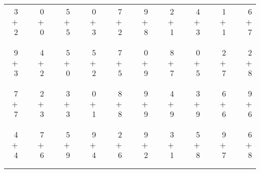 \documentclass[12pt, letterpaper]{article}
\begin{document}
\begin{tabular}{rrrrrrrrrrrrrrrrrrr}
3 & & 0 & & 5 & & 0 & & 7 & & 9 & & 2 & & 4 & & 1 & & 6\\
$+$ 2 & & $+$ 0 & & $+$ 5 & & $+$ 3 & & $+$ 2 & & $+$ 8 & & $+$ 1 & & $+$ 3 & & $+$ 1 & & $+$ 7\\
\cline{1-1} \cline{3-3} \cline{5-5} \cline{7-7} \cline{9-9} \cline{11-11} \cline{13-13} \cline{15-15} \cline{17-17} \cline{19-19} \\ \\
9 & & 4 & & 5 & & 5 & & 7 & & 0 & & 8 & & 0 & & 2 & & 2\\
$+$ 3 & & $+$ 2 & & $+$ 0 & & $+$ 2 & & $+$ 5 & & $+$ 9 & & $+$ 7 & & $+$ 5 & & $+$ 7 & & $+$ 8\\
\cline{1-1} \cline{3-3} \cline{5-5} \cline{7-7} \cline{9-9} \cline{11-11} \cline{13-13} \cline{15-15} \cline{17-17} \cline{19-19} \\ \\
7 & & 2 & & 3 & & 0 & & 8 & & 9 & & 4 & & 3 & & 6 & & 9\\
$+$ 7 & & $+$ 3 & & $+$ 3 & & $+$ 1 & & $+$ 8 & & $+$ 9 & & $+$ 9 & & $+$ 9 & & $+$ 6 & & $+$ 6\\
\cline{1-1} \cline{3-3} \cline{5-5} \cline{7-7} \cline{9-9} \cline{11-11} \cline{13-13} \cline{15-15} \cline{17-17} \cline{19-19} \\ \\
4 & & 7 & & 5 & & 9 & & 2 & & 9 & & 3 & & 5 & & 9 & & 6\\
$+$ 4 & & $+$ 6 & & $+$ 9 & & $+$ 4 & & $+$ 6 & & $+$ 2 & & $+$ 1 & & $+$ 8 & & $+$ 7 & & $+$ 8\\
\cline{1-1} \cline{3-3} \cline{5-5} \cline{7-7} \cline{9-9} \cline{11-11} \cline{13-13} \cline{15-15} \cline{17-17} \cline{19-19} \\ \\
\end{tabular}
\newpage
\end{document}
